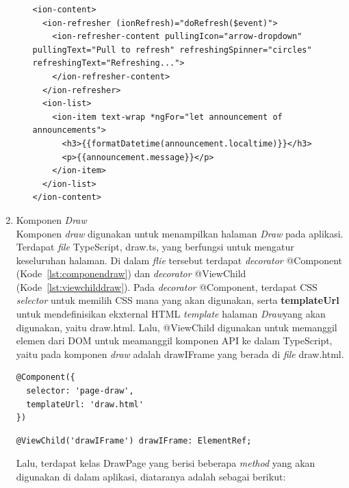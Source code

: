 \begin{enumerate}
\begin{itemize}
\newpage		
		
\begin{lstlisting}[label={lst:contentannouncement}, caption=\textit{Content} pada Halaman \textit{Annoncement}]
<ion-content>
  <ion-refresher (ionRefresh)="doRefresh($event)">
    <ion-refresher-content pullingIcon="arrow-dropdown" pullingText="Pull to refresh" refreshingSpinner="circles" refreshingText="Refreshing...">
    </ion-refresher-content>
  </ion-refresher>
  <ion-list>
    <ion-item text-wrap *ngFor="let announcement of announcements">
      <h3>{{formatDatetime(announcement.localtime)}}</h3>
      <p>{{announcement.message}}</p>
    </ion-item>
  </ion-list>
</ion-content>
\end{lstlisting} 
	\end{itemize}
	
	\item Komponen \textit{Draw} \\
	Komponen \textit{draw} digunakan untuk menampilkan halaman \textit{Draw} pada aplikasi. Terdapat \textit{file} TypeScript, draw.ts, yang berfungsi untuk mengatur keseluruhan halaman. Di dalam \textit{flie} tersebut terdapat \textit{decorator} @Component (Kode~\ref{lst:componendraw}) dan \textit{decorator} @ViewChild (Kode~\ref{lst:viewchilddraw}). Pada \textit{decorator} @Component, terdapat CSS \textit{selector} untuk memilih CSS mana yang akan digunakan, serta \textbf{templateUrl} untuk mendefinisikan ekxternal HTML \textit{template} halaman \textit{Draw}yang akan digunakan, yaitu draw.html. Lalu, @ViewChild digunakan untuk memanggil elemen dari DOM untuk meamanggil komponen API ke dalam TypeScript, yaitu pada komponen \textit{draw} adalah drawIFrame yang berada di \textit{file} draw.html.
\begin{lstlisting}[label={lst:componendraw}, caption=@Component pada draw.ts]
@Component({
  selector: 'page-draw',
  templateUrl: 'draw.html'
})
\end{lstlisting} 

\begin{lstlisting}[label={lst:viewchilddraw}, caption=@ViewChild pada draw.ts]
@ViewChild('drawIFrame') drawIFrame: ElementRef;
\end{lstlisting} 

	Lalu, terdapat kelas DrawPage yang berisi beberapa \textit{method} yang akan digunakan di dalam aplikasi, diataranya adalah sebagai berikut:
	

\end{enumerate}
